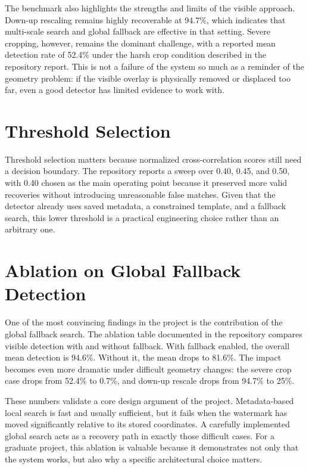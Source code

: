 \documentclass[12pt,oneside]{report}
\begin{document}
The benchmark also highlights the strengths and limits of the visible approach. Down-up rescaling remains highly recoverable at 94.7\%, which indicates that multi-scale search and global fallback are effective in that setting. Severe cropping, however, remains the dominant challenge, with a reported mean detection rate of 52.4\% under the harsh crop condition described in the repository report. This is not a failure of the system so much as a reminder of the geometry problem: if the visible overlay is physically removed or displaced too far, even a good detector has limited evidence to work with.

\section{Threshold Selection}
Threshold selection matters because normalized cross-correlation scores still need a decision boundary. The repository reports a sweep over 0.40, 0.45, and 0.50, with 0.40 chosen as the main operating point because it preserved more valid recoveries without introducing unreasonable false matches. Given that the detector already uses saved metadata, a constrained template, and a fallback search, this lower threshold is a practical engineering choice rather than an arbitrary one.

\section{Ablation on Global Fallback Detection}
One of the most convincing findings in the project is the contribution of the global fallback search. The ablation table documented in the repository compares visible detection with and without fallback. With fallback enabled, the overall mean detection is 94.6\%. Without it, the mean drops to 81.6\%. The impact becomes even more dramatic under difficult geometry changes: the severe crop case drops from 52.4\% to 0.7\%, and down-up rescale drops from 94.7\% to 25\%.

These numbers validate a core design argument of the project. Metadata-based local search is fast and usually sufficient, but it fails when the watermark has moved significantly relative to its stored coordinates. A carefully implemented global search acts as a recovery path in exactly those difficult cases. For a graduate project, this ablation is valuable because it demonstrates not only that the system works, but also why a specific architectural choice matters.
\end{document}
